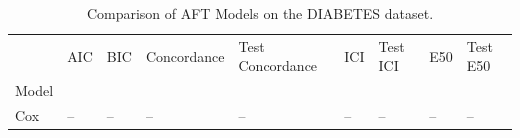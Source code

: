 \begin{table}
\centering
\caption{Comparison of AFT Models on the DIABETES dataset.}
\label{tab:diabetes}
\begin{tabular}{lllllllll}
\toprule
 & AIC & BIC & Concordance & Test Concordance & ICI & Test ICI & E50 & Test E50 \\
Model &  &  &  &  &  &  &  &  \\
\midrule
Cox & -- & -- & -- & -- & -- & -- & -- & -- \\
\bottomrule
\end{tabular}
\end{table}

